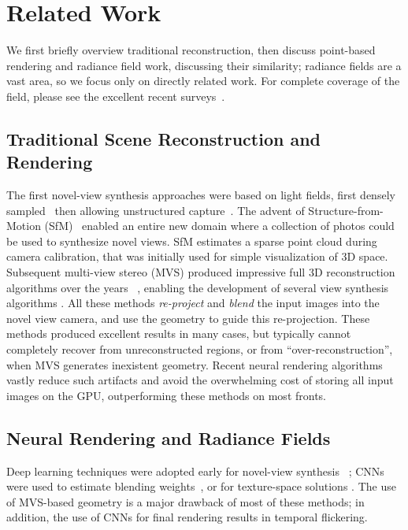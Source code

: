 \section{Related Work}

We first briefly overview traditional reconstruction, then discuss point-based rendering and radiance field work, discussing their similarity; radiance fields are a vast area, so we focus only on directly related work.
For complete coverage of the field, please see the excellent recent surveys~\cite{tewari2022advances,xie2022neural}.


\subsection{Traditional Scene Reconstruction and Rendering}

The first novel-view synthesis approaches were based on light fields, first densely sampled~\cite{gortler1996lumigraph,levoy1996light} then allowing unstructured capture~\cite{buehler2001unstructured}. The advent of Structure-from-Motion (SfM)~\cite{snavely2006photo} enabled an entire new domain where a collection of photos could be used to synthesize novel views. SfM estimates a sparse point cloud during camera calibration, that was initially used for simple visualization of 3D space. Subsequent multi-view stereo (MVS) produced impressive full 3D reconstruction algorithms over the years ~\cite{goesele2007multi}, enabling the development of several view synthesis algorithms \cite{eisemann2008floating, chaurasia2013depth, hedman2018deep,kopanas21}.
All these methods \emph{re-project} and \emph{blend} the input images into the novel view camera, and use the geometry to guide this re-projection. These methods produced excellent results in many cases, but typically cannot completely recover from unreconstructed regions, or from ``over-reconstruction'', when MVS generates inexistent geometry.
Recent neural rendering algorithms ~\cite{tewari2022advances} vastly reduce such artifacts and avoid the overwhelming cost of storing all input images on the GPU, outperforming these methods on most fronts.

\subsection{Neural Rendering and Radiance Fields}

Deep learning techniques were adopted early for novel-view synthesis ~\cite{zhou2016view, flynn2016deepstereo}; CNNs were used to estimate blending weights~\cite{hedman2018deep}, or for texture-space solutions \cite{thies2019deferred,riegler2020free}. The use of MVS-based geometry is a major drawback of most of these methods; in addition, the use of CNNs for final rendering  results in  temporal flickering.

